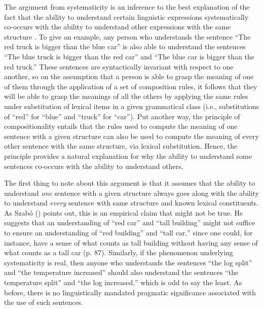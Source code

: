 The argument from systematicity is an inference to the best explanation of the fact that the ability to understand certain linguistic expressions systematically co-occurs with the ability to understand other expressions with the same structure \citep{FodorPylyshyn:1988,Szabo:2012,Szabo:2013,FodorLepore:2002}. To give an example, any person who understands the sentence ``The red truck is bigger than the blue car'' is also able to understand the sentences ``The blue truck is bigger than the red car'' and ``The blue car is bigger than the red truck.'' These sentences are syntactically invariant with respect to one another, so on the assumption that a person is able to grasp the meaning of one of them through the application of a set of composition rules, it follows that they will be able to grasp the meanings of all the others by applying the same rules under substitution of lexical items in a given grammatical class (i.e., substitutions of ``red'' for ``blue'' and ``truck'' for ``car''). Put another way, the principle of compositionality entails that the rules used to compute the meaning of one sentence with a given structure can also be used to compute the meaning of every other sentence with the same structure, via lexical substitution. Hence, the principle provides a natural explanation for why the ability to understand some sentences co-occurs with the ability to understand others. 

The first thing to note about this argument is that it assumes that the ability to understand \textit{one} sentence with a given structure always goes along with the ability to understand \textit{every} sentence with same structure and known lexical constituents. As Szab\'o (\citeyear{Szabo:2013,Szabo:2012}) points out, this is an empirical claim that might not be true. He suggests that an understanding of ``red car'' and ``tall building'' might not suffice to ensure an understanding of ``red building'' and ``tall car,'' since one could, for instance, have a sense of what counts as tall building without having any sense of what counts as a tall car (p. 87). Similarly, if the phenomenon underlying systematicity is real, then anyone who understands the sentences ``the log split'' and ``the temperature increased'' should also understand the sentences ``the temperature split'' and ``the log increased,'' which is odd to say the least. As before, there is no linguistically mandated pragmatic significance associated with the use of such sentences.

